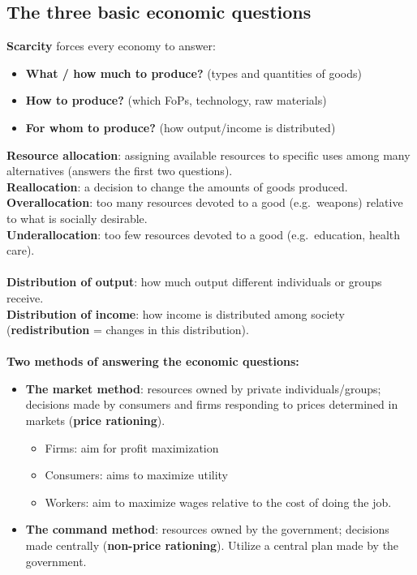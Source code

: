 \subsection{The three basic economic questions}
\textbf{Scarcity} forces every economy to answer:
\begin{itemize}
  \item \textbf{What / how much to produce?} (types and quantities of goods)
  \item \textbf{How to produce?} (which FoPs, technology, raw materials)
  \item \textbf{For whom to produce?} (how output/income is distributed)
\end{itemize}
\textbf{Resource allocation}: assigning available resources to specific uses among many alternatives (answers the first two questions).\\
\textbf{Reallocation}: a decision to change the amounts of goods produced.\\
\textbf{Overallocation}: too many resources devoted to a good (e.g.\ weapons) relative to what is socially desirable.\\
\textbf{Underallocation}: too few resources devoted to a good (e.g.\ education, health care).\\\\
\textbf{Distribution of output}: how much output different individuals or groups receive.\\
\textbf{Distribution of income}: how income is distributed among society (\textbf{redistribution} = changes in this distribution).\\\\
\textbf{Two methods of answering the economic questions:}
\begin{itemize}
  \item \textbf{The market method}: resources owned by private individuals/groups; decisions made by consumers and firms responding to prices determined in markets (\textbf{price rationing}).
	\begin{itemize}
		\item Firms: aim for profit maximization
		\item Consumers: aims to maximize utility
		\item Workers: aim to maximize wages relative to the cost of doing the job.
	\end{itemize}
  \item \textbf{The command method}: resources owned by the government; decisions made centrally (\textbf{non-price rationing}). Utilize a central plan made by the government.
\end{itemize}
